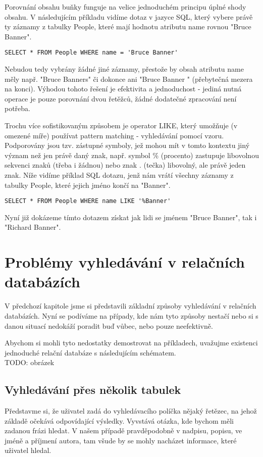 \documentclass[11pt,draft,oneside]{fithesis2}
\begin{document}
Porovnání obsahu buňky funguje na velice jednoduchém principu úplné shody obsahu. V následujícím příkladu vidíme dotaz v jazyce SQL, který vybere právě ty záznamy z tabulky People, které mají hodnotu atributu name rovnou "Bruce Banner". 
\begin{verbatim}
SELECT * FROM People WHERE name = 'Bruce Banner'
\end{verbatim}

Nebudou tedy vybrány žádné jiné záznamy, přestože by obsah atributu name měly např. "Bruce Banners" či dokonce ani "Bruce Banner " (přebytečná mezera na konci). Výhodou tohoto řešení je efektivita a jednoduchost - jediná nutná operace je 
pouze porovnání dvou řetěžců, žádné dodatečné zpracování není potřeba. 

Trochu více sofistikovaným způsobem je operator LIKE, který umožňuje (v omezené míře) používat pattern matching - vyhledávání pomocí vzoru. Podporovány jsou tzv. zástupné symboly, jež mohou mít v tomto kontextu jiný význam než jen právě daný znak, např. symbol \% 
(procento) zastupuje libovolnou sekvenci znaků (třeba i žádnou) nebo znak . (tečka) libovolný, ale právě jeden znak. Níže vidíme příklad SQL dotazu, jenž nám vrátí všechny záznamy z tabulky People, které jejich jméno končí na "Banner".
\begin{verbatim}
SELECT * FROM People WHERE name LIKE '%Banner'
\end{verbatim}

Nyní již dokázeme tímto dotazem získat jak lidi se jménem "Bruce Banner", tak i "Richard Banner". 

\section{Problémy vyhledávání v relačních databázích}
V předchozí kapitole jsme si představili základní způsoby vyhledávání v relačních databázích. Nyní se podíváme na případy, kde nám tyto způsoby nestačí nebo si s danou situací nedokáží poradit buď vůbec, nebo pouze neefektivně.

Abychom si mohli tyto nedostatky demostrovat na příkladech, uvažujme existenci jednoduché relační databáze s následujícím schématem.
\\ TODO: obrázek

\subsection{Vyhledávání přes několik tabulek}
Představme si, že uživatel zadá do vyhledávacího políčka nějaký řetězec, na jehož základě očekává odpovídající výsledky. Vyvstává otázka, kde bychom měli zadanou frázi hledat. V našem případě
pravděpodobně v nadpisu, popisu, ve jméně a příjmení autora, tam všude by se mohly nacházet informace, které uživatel hledal. 
\end{document}
